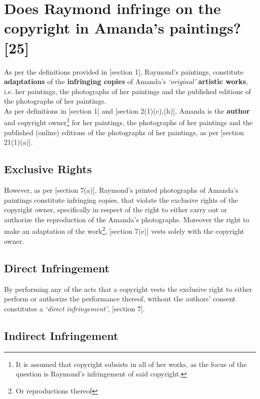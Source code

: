 \documentclass[11pt]{article}
\begin{document}
\section{Does Raymond infringe on the copyright in Amanda's paintings? [25]}
\label{sec:org8169b4f}
As per the definitions provided in [section 1]\cite{rsa78_copyrightact},
Raymond's paintings, constitute \textbf{adaptations} of the \textbf{infringing copies} of
Amanda's \emph{`original'} \textbf{artistic works}, i.e. her paintings, the photographs
of her paintings and the published editions of the photographs of her
paintings.\\

As per definitions in [section 1]\cite{rsa78_copyrightact} and [section
2(1)(c),(h)]\cite{rsa78_copyrightact}, Amanda is the \textbf{author} and copyright
owner\footnote{It is assumed that copyright subsists in all of her works, as the
focus of the question is Raymond's infringement of said copyright.} for her
paintings, the photographs of her paintings and the published (online) editions
of the photographs of her paintings, as per [section
21(1)(a)]\cite{rsa78_copyrightact}.\\

\subsection{Exclusive Rights}
\label{sec:orga3e9715}

However, as per [section 7(a)]\cite{rsa78_copyrightact}, Raymond's printed
photographs of Amanda's paintings constitute infringing copies, that violate the
exclusive rights of the copyright owner, specifically in respect of the right to
either carry out or authorize the reproduction of the Amanda's
photographs. Moreover the right to make an adaptation of the work\footnote{Or
reproductions thereof}, [section 7(e)]\cite{rsa78_copyrightact} vests solely with the copyright owner.\\

\subsection{Direct Infringement}
\label{sec:org61aab45}
By performing any of the acts that a copyright vests the exclusive
right to either perform or authorize the performance thereof, without
the authors' consent constitutes a \emph{`direct infringement'}, [section
7]\cite{rsa78_copyrightact}.

\subsection{Indirect Infringement}
\label{sec:orgdc0a005}
\end{document}

